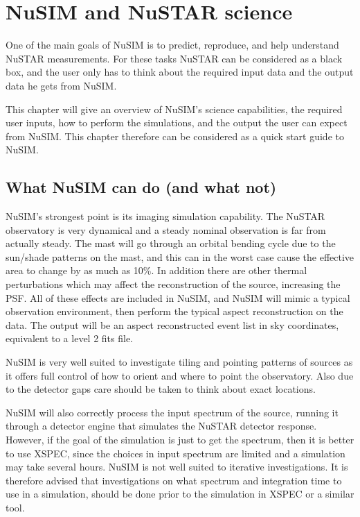 %

\chapter{NuSIM and NuSTAR science}

One of the main goals of NuSIM is to predict, reproduce, and help understand NuSTAR measurements.
For these tasks NuSTAR can be considered as a black box, and the user only has to think about the required input data and the output data he gets from NuSIM. 

This chapter will give an overview of NuSIM's science capabilities, the required user inputs, how to perform the simulations, and the output the user can expect from NuSIM. This chapter therefore can be considered as a quick start guide to NuSIM.

\section{What NuSIM can do (and what not)}

NuSIM's strongest point is its imaging simulation capability. The NuSTAR observatory is very dynamical and a steady nominal observation is far from actually steady. The mast will go through an orbital bending cycle due to the sun/shade patterns on the mast, and this can in the worst case cause the effective area to change  by as much as 10\%. In addition there are other thermal perturbations which may affect the reconstruction of the source, increasing the PSF. All of these effects are included in NuSIM, and NuSIM will mimic a typical observation environment, then perform the typical aspect reconstruction on the data. The output will be an aspect reconstructed event list in sky coordinates, equivalent to a level 2 fits file.

NuSIM is very well suited to investigate tiling and pointing patterns of sources as it offers full control of how to orient and where to point the observatory. Also due to the detector gaps care should be taken to think about exact locations.

NuSIM will also correctly process the input spectrum of the source, running it through a detector engine that simulates the NuSTAR detector response. However, if the goal of the simulation is just to get the spectrum, then it is better to use XSPEC, since the choices in input spectrum are limited and a simulation may take several hours. NuSIM is not well suited to iterative investigations. It is therefore advised that investigations on what spectrum and integration time to use in a simulation, should be done prior to the simulation in XSPEC or a similar tool.

